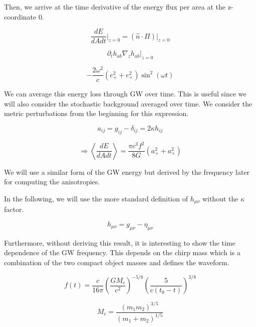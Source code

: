 Then, we arrive at the time derivative of the energy flux per area at the z-coordinate 0.

\begin{equation}
    \frac{dE}{dAdt}\left.\right|_{z=0} = (\hat{n}\cdot \Pi)\left.\right|_{z=0}
\end{equation}

\begin{equation}
    \partial_t h_{ab}\nabla_z h_{ab}\left.\right|_{z=0}
\end{equation}

\begin{equation}
    -\frac{2\omega^2}{c}(e_+^2 + e_\times^2)\sin^2(\omega t)
\end{equation}

We can average this energy loss through GW over time. This is useful since we will also consider the stochastic background averaged over time. We consider the metric perturbations from the beginning for this expression.

\begin{equation}
    a_{ij}=g_{ij}-\delta_{ij}=2\kappa h_{ij}
\end{equation}

\begin{equation}
    \Rightarrow \left\langle\frac{dE}{dAdt}\right\rangle=\frac{\pi c^3f^2}{8G}(a_+^2+a_\times^2)
\end{equation}

We will use a similar form of the GW energy but derived by the frequency later for computing the anisotropies.

In the following, we will use the more standard definition of $h_{\mu\nu}$ without the $\kappa$ factor.

\begin{equation}
    h_{\mu\nu} = g_{\mu\nu}-\eta_{\mu\nu}
\end{equation}

Furthermore, without deriving this result, it is interesting to show the time dependence of the GW frequency. This depends on the chirp mass which is a combination of the two compact object masses and defines the waveform.

\begin{equation}
    f(t)=\frac{c}{16\pi}\left(\frac{GM_c}{c^2}\right)^{-5/8}\left(\frac{5}{c(t_0-t)}\right)^{3/8}
\end{equation}


\begin{equation}
    M_c=\frac{(m_1 m_2)^{3/5}}{(m_1+m_2)^{1/5}}
\end{equation}

